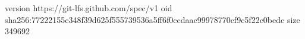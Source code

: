 version https://git-lfs.github.com/spec/v1
oid sha256:77222155c348f39d625f555739536a5ff6f0ccdaac99978770cf9c5f22c0bedc
size 349692
